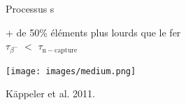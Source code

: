\documentclass[10pt]{beamer}
\subtitle{Étude de spectres infrarouges de géantes rouges évoluées}
\date{}
\author{\small Margaux Vandererven}
\institute{\small Supervisé par Sophie Van Eck}
\begin{document}
\maketitle

\begin{frame}[fragile]{Processus s}
    \begin{center}
        + de 50\% éléments plus lourds que le fer \\
        $\tau_{\beta^-}$ $<$ $\tau_{\mathrm{n-capture}}$
    \end{center}
    \vfill

    \begin{center}

        \texttt{[image: images/medium.png]} \\
        \end{center}
    \footnotesize{Käppeler et al. 2011.}


\end{frame}
\end{document}
